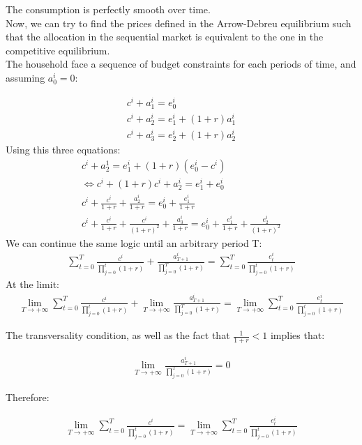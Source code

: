 \documentclass{article}
\begin{document}
The consumption is perfectly smooth over time.\\

Now, we can try to find the prices defined in the Arrow-Debreu equilibrium such that the allocation in the sequential market is equivalent to the one in the competitive equilibrium.\\

The household face a sequence of budget constraints for each periods of time, and assuming $a_0^i=0$:

\begin{gather*}
    c^i+a_1^i=e_0^i\\
    c^i+a_2^i=e_1^i+(1+r)a_1^i\\
    c^i+a_3^i=e_2^i+(1+r)a_2^i
\end{gather*}
Using this three equations:
\begin{gather*}
    c^i+a_2^1=e^i_1+(1+r)(e_0^i-c^i)\\
    \Leftrightarrow c^i+(1+r)c^i+a_2^i=e^i_1+e_0^i\\
    c^i+\frac{c^i}{1+r}+\frac{a_2^i}{1+r}=e_0^i+\frac{e^i_1}{1+r}\\
    c^i+\frac{c^i}{1+r}+\frac{c^i}{(1+r)^2}+\frac{a_3^i}{1+r}=e_0^i+\frac{e^i_1}{1+r}+\frac{e^i_2}{(1+r)^2}
\end{gather*}
We can continue the same logic until an arbitrary period T:
\begin{gather*}
    \sum^T_{t=0}\frac{c^i}{\prod^t_{j=0}(1+r)}+\frac{a^i_{T+1}}{\prod^T_{j=0}(1+r)}= \sum^T_{t=0}\frac{e^i_t}{\prod^t_{j=0}(1+r)}
\end{gather*}
At the limit:
\begin{gather*}
    \lim_{T\rightarrow+\infty}\sum^T_{t=0}\frac{c^i}{\prod^t_{j=0}(1+r)}+\lim_{T\rightarrow+\infty}\frac{a^i_{T+1}}{\prod^T_{j=0}(1+r)}= \lim_{T\rightarrow+\infty}\sum^T_{t=0}\frac{e^i_t}{\prod^t_{j=0}(1+r)}
\end{gather*}

The transversality condition, as well as the fact that $\frac{1}{1+r} < 1$ implies that:

\begin{gather*}
    \lim_{T\rightarrow+\infty}\frac{a^i_{T+1}}{\prod^T_{j=0}(1+r)}=0
\end{gather*}

Therefore:

\begin{gather}
    \lim_{T\rightarrow+\infty}\sum^T_{t=0}\frac{c^i}{\prod^t_{j=0}(1+r)} = \lim_{T\rightarrow+\infty}\sum^T_{t=0}\frac{e^i_t}{\prod^t_{j=0}(1+r)}
\end{gather}
\end{document}
